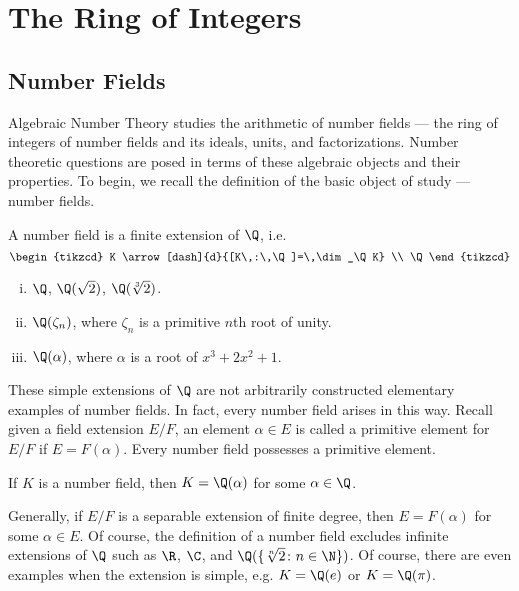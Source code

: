 
\section{The Ring of Integers}
\subsection{Number Fields}

Algebraic Number Theory studies the arithmetic of number fields --- the ring of integers of number fields and its ideals, units, and factorizations. Number theoretic questions are posed in terms of these algebraic objects and their properties. To begin, we recall the definition of the basic object of study --- number fields. 


\begin{dfn}
A number field is a finite extension of $\Q$, i.e.
	\[
	\begin{tikzcd}
	K \arrow[dash]{d}{[K\,:\,\Q]=\,\dim_\Q K} \\
	\Q
	\end{tikzcd}
	\]
\end{dfn}


\begin{ex} \hfill
	\begin{enumerate}[(i)]
	\item $\Q$, $\Q(\sqrt{2})$, $\Q(\sqrt[3]{2})$.
	\item $\Q(\zeta_n)$, where $\zeta_n$ is a primitive $n$th root of unity.
	\item $\Q(\alpha)$, where $\alpha$ is a root of $x^3+2x^2+1$.
	\end{enumerate}
\end{ex}


These simple extensions of $\Q$ are not arbitrarily constructed elementary examples of number fields. In fact, every number field arises in this way. Recall given a field extension $E/F$, an element $\alpha \in E$ is called a primitive element for $E/F$ if $E=F(\alpha)$. Every number field possesses a primitive element.  


\begin{thm} \label{thm:primelmthm}
If $K$ is a number field, then $K=\Q(\alpha)$ for some $\alpha \in \Q$.
\end{thm}


Generally, if $E/F$ is a separable extension of finite degree, then $E=F(\alpha)$ for some $\alpha \in E$. Of course, the definition of a number field excludes infinite extensions of $\Q$ such as $\R$, $\C$, and $\Q(\{\sqrt[n]{2} \colon n \in \N\})$. Of course, there are even examples when the extension is simple, e.g. $K=\Q(e)$ or $K=\Q(\pi)$. 


